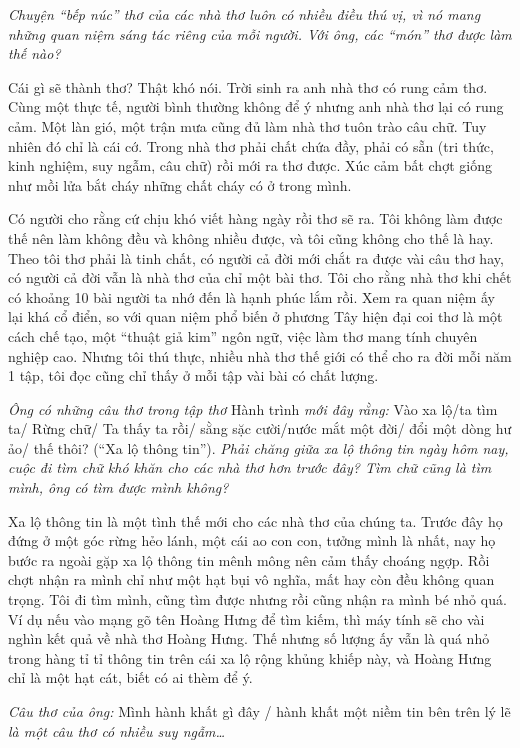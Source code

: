 \documentclass[../main.tex]{subfiles}
\begin{document}
\begin{multicols}{2}
\textit{Chuyện “bếp núc” thơ  của các nhà thơ luôn có nhiều điều thú vị, vì nó mang những quan niệm sáng tác riêng của mỗi người. Với ông, các “món” thơ được làm thế nào?} 
 
Cái gì sẽ thành thơ? Thật khó nói. Trời sinh ra anh nhà thơ có rung cảm thơ. Cùng một thực tế, người bình thường không để ý nhưng anh nhà thơ lại có rung cảm. Một làn gió, một trận mưa cũng đủ làm nhà thơ tuôn trào câu chữ. Tuy nhiên đó chỉ là cái cớ. Trong nhà thơ phải chất chứa đầy, phải có sẵn (tri thức, kinh nghiệm, suy ngẫm, câu chữ) rồi mới ra thơ được. Xúc cảm bất chợt giống như mồi lửa bắt cháy những chất cháy có ở trong mình.  
 
Có người cho rằng cứ chịu khó viết hàng ngày rồi thơ sẽ ra. Tôi không làm được thế nên làm không đều và không nhiều được, và tôi cũng không cho thế là hay. Theo tôi thơ phải là tinh chất, có người cả đời mới chắt ra được vài câu thơ hay, có người cả đời vẫn là nhà thơ của chỉ một bài thơ. Tôi cho rằng nhà thơ khi chết có khoảng 10 bài người ta nhớ đến là hạnh phúc lắm rồi. Xem ra quan niệm ấy lại khá cổ điển, so với quan niệm phổ biến ở phương Tây hiện đại coi thơ là một cách chế tạo, một “thuật giả kim” ngôn ngữ, việc làm thơ mang tính chuyên nghiệp cao. Nhưng tôi thú thực, nhiều nhà thơ thế giới có thể cho ra đời mỗi năm 1 tập, tôi đọc cũng chỉ thấy ở mỗi tập vài bài có chất lượng.  
  
\textit{Ông có những câu thơ trong tập thơ }Hành trình\textit{ mới đây rằng: }Vào xa lộ/ta tìm ta/ Rừng chữ/ Ta thấy ta rồi/ sằng sặc cười/nước mắt một đời/ đổi một dòng hư ảo/ thế thôi? (“Xa lộ thông tin”).\textit{ Phải chăng giữa xa lộ thông tin ngày hôm nay, cuộc đi tìm chữ khó khăn cho các nhà thơ hơn trước đây? Tìm chữ cũng là tìm mình, ông có tìm được mình không?} 
 
Xa lộ thông tin là một tình thế mới cho các nhà thơ của chúng ta. Trước đây họ đứng ở một góc rừng hẻo lánh, một cái ao con con, tưởng mình là nhất, nay họ bước ra ngoài gặp xa lộ thông tin mênh mông nên cảm thấy choáng ngợp. Rồi chợt nhận ra mình chỉ như một hạt bụi vô nghĩa, mất hay còn đều không quan trọng. Tôi đi tìm mình, cũng tìm được nhưng rồi cũng nhận ra mình bé nhỏ quá. Ví dụ nếu vào mạng gõ tên Hoàng Hưng để tìm kiếm, thì máy tính sẽ cho vài nghìn kết quả về nhà thơ Hoàng Hưng. Thế nhưng số lượng ấy vẫn là quá nhỏ trong hàng tỉ tỉ thông tin trên cái xa lộ rộng khủng khiếp này, và Hoàng Hưng chỉ là một hạt cát, biết có ai thèm để ý.  
 
\textit{Câu thơ của ông: }Mình hành khất gì đây / hành khất một niềm tin bên trên lý lẽ\textit{ là một câu thơ có nhiều suy ngẫm…} 
 

\end{multicols}
\end{document}
